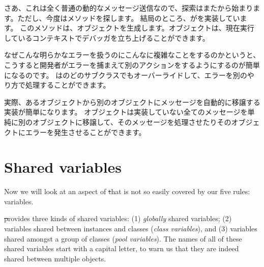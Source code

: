 \documentclass[a4paper,10pt,twoside]{book}
\begin{document}
さあ、これは全く普通の動的なメッセージ送信なので、探索はまたから始まります。ただし、今度はメソッドを探します。
結局のところ、がを実装しています。
このメソッドは、オブジェクトを生成します。オブジェクトは、現在実行しているコンテキストでデバッガを立ち上げることができます。

なぜこんな明らかなエラーを扱うのにこんなに複雑なことをするのかというと、
こうすると開発者がエラーを捕まえて別のアクションをするようにするのが簡単になるのです。
はのどのサブクラスでもオーバーライドして、エラーを別のやり方で処理することができます。

実際、あるオブジェクトから別のオブジェクトにメッセージを自動的に移譲する実装が簡単になります。
オブジェクトは実装していない全てのメッセージを単純に別のオブジェクトに移譲して、そのメッセージを処理させたりそのオブジェクトにエラーを発生させることができます。

\section{Shared variables}

Now we will look at an aspect of \st that is not so easily covered by our five rules:  variables.

\st provides three kinds of shared variables: (1) \emph{globally} shared variables; (2) variables shared between instances and classes (\emph{class variables}), and (3) variables shared amongst a group of  classes (\emph{pool variables}).  The names of all of these shared variables start with a capital letter, to warn us that they are indeed shared between multiple objects.
\end{document}

